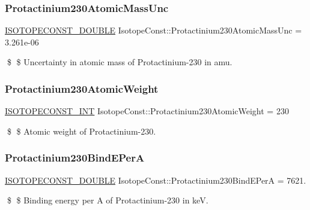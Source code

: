 \subsubsection{\texorpdfstring{Protactinium230\+Atomic\+Mass\+Unc}{Protactinium230AtomicMassUnc}}
{\footnotesize\ttfamily \mbox{\hyperlink{group___isotope_const-_macros_ga8f45a7272ce02c0b4c65c44636ed719a}{I\+S\+O\+T\+O\+P\+E\+C\+O\+N\+S\+T\+\_\+\+D\+O\+U\+B\+LE}} Isotope\+Const\+::\+Protactinium230\+Atomic\+Mass\+Unc = 3.\+261e-\/06}

\$ \$ Uncertainty in atomic mass of Protactinium-\/230 in amu. \mbox{\label{group___isotope_const-_protactinium-_pa230_ga94650b18a9ee808793854e3b451869ad}} 
\subsubsection{\texorpdfstring{Protactinium230\+Atomic\+Weight}{Protactinium230AtomicWeight}}
{\footnotesize\ttfamily \mbox{\hyperlink{group___isotope_const-_macros_ga5f18360b3e99483a35c32d789e62621c}{I\+S\+O\+T\+O\+P\+E\+C\+O\+N\+S\+T\+\_\+\+I\+NT}} Isotope\+Const\+::\+Protactinium230\+Atomic\+Weight = 230}

\$ \$ Atomic weight of Protactinium-\/230. \mbox{\label{group___isotope_const-_protactinium-_pa230_ga0e7e209c311350228ec5ce519c084af5}} 
\subsubsection{\texorpdfstring{Protactinium230\+Bind\+E\+PerA}{Protactinium230BindEPerA}}
{\footnotesize\ttfamily \mbox{\hyperlink{group___isotope_const-_macros_ga8f45a7272ce02c0b4c65c44636ed719a}{I\+S\+O\+T\+O\+P\+E\+C\+O\+N\+S\+T\+\_\+\+D\+O\+U\+B\+LE}} Isotope\+Const\+::\+Protactinium230\+Bind\+E\+PerA = 7621.}

\$ \$ Binding energy per A of Protactinium-\/230 in keV. \mbox{\label{group___isotope_const-_protactinium-_pa230_gad38656a527ac3e634ab594f5b35f324f}} 
